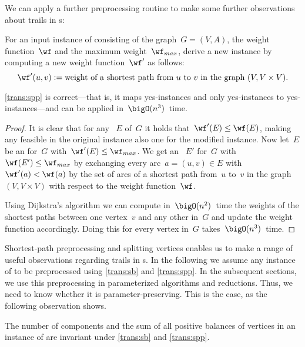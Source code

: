 We can apply a further preprocessing routine to make some further observations about trails in \EE s:
\begin{transformation}
  \label{trans:spp}
  For an input instance of \pWMEEs{} consisting of the graph~$G = (V, A)$, the weight function~$\wf$ and the maximum weight~$\wf_{max}$, derive a new instance by computing a new weight function~$\wf'$ as follows:
  $$\wf'(u,v):=\text{weight of a shortest path from $u$ to $v$ in the graph~$(V, V \times V)$}\text{.}$$
\end{transformation}
\begin{lemma}\label{lem:spp}
  \autoref{trans:spp} is correct---that is, it maps yes-instances and only yes-instances to yes-instances---and can be applied in~$\bigO(n^3)$~time.
\end{lemma}
\begin{proof}
  It is clear that for any \EE{}~$E$ of~$G$ it holds that~$\wf'(E) \leq \wf(E)$, making any feasible \EE{} in the original instance also one for the modified instance. Now let~$E$ be an \EE{} for~$G$ with~$\wf'(E) \leq \wf_{max}$. We get an \EE{}~$E'$ for~$G$ with~$\wf(E') \leq \wf_{max}$ by exchanging every arc~$a =(u, v) \in E$ with~$\wf'(a) < \wf(a)$ by the set of arcs of a shortest path from~$u$ to~$v$ in the graph~$(V, V \times V)$ with respect to the weight function~$\wf$.

Using Dijkstra's algorithm we can compute in~$\bigO(n^2)$~time the weights of the shortest paths between one vertex~$v$ and any other in~$G$ and update the weight function accordingly. Doing this for every vertex in~$G$ takes~$\bigO(n^3)$~time.
\end{proof}
Shortest-path preprocessing and splitting vertices enables us to make a range of useful observations regarding trails in \EE s. In the following we assume any instance of \WMEE{} to be preprocessed using \autoref{trans:sb} and \autoref{trans:spp}. In the subsequent sections, we use this preprocessing in parameterized algorithms and reductions. Thus, we need to know whether it is parameter-preserving. This is the case, as the following observation shows. \begin{observation}\label{obs:sbsppinvariants}
  The number of components and the sum of all positive balances of vertices in an instance of \pWMEEs{} are invariant under \autoref{trans:sb} and \autoref{trans:spp}.
\end{observation}

